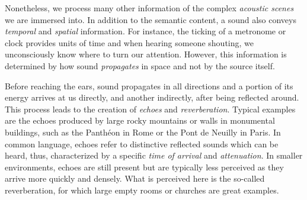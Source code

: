 
\mynewline
Nonetheless, we process many other information of the complex \textit{acoustic scenes} we are immersed into.
In addition to the semantic content, a sound also conveys \textit{temporal} and \textit{spatial} information.
For instance, the ticking of a metronome or clock provides units of time and when hearing someone shouting, we unconsciously know where to turn our attention.
However, this information is determined by how sound \textit{propagates} in space and not by the source itself.

\mynewline
Before reaching the ears, sound propagates in all directions and a portion of its energy arrives at us directly, and another indirectly, after being reflected around.
This process leads to the creation of \textit{echoes} and \textit{reverberation}.
Typical examples are the echoes produced by large rocky mountains or walls in monumental buildings, such as the Panthéon in Rome or the Pont de Neuilly in Paris.
In common language, echoes refer to distinctive reflected sounds which can be heard, thus, characterized by a specific \textit{time of arrival} and \textit{attenuation}.
In smaller environments, echoes are still present but are typically less perceived as they arrive more quickly and densely.
What is perceived here is the so-called reverberation, for which large empty rooms or churches are great examples.

